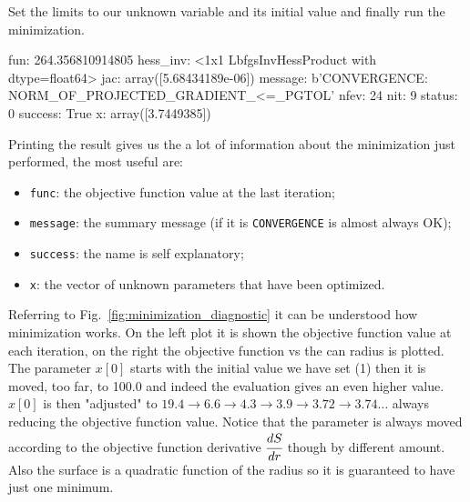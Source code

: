 
Set the limits to our unknown variable and its initial value and finally run the minimization.

\begin{ioutput}
      fun: 264.356810914805
 hess_inv: <1x1 LbfgsInvHessProduct with dtype=float64>
      jac: array([5.68434189e-06])
  message: b'CONVERGENCE: NORM_OF_PROJECTED_GRADIENT_<=_PGTOL'
     nfev: 24
      nit: 9
   status: 0
  success: True
        x: array([3.7449385])
\end{ioutput}

Printing the result gives us the a lot of information about the minimization just performed, the most useful are:
\begin{itemize}
\item \texttt{func}: the objective function value at the last iteration;
\item \texttt{message}: the summary message (if it is \texttt{CONVERGENCE} is almost always OK);
\item \texttt{success}: the name is self explanatory;
\item \texttt{x}: the vector of unknown parameters that have been optimized.
\end{itemize}

Referring to Fig.~\ref{fig:minimization_diagnostic} it can be understood how minimization works. On the left plot it is shown the objective function value at each iteration, on the right the objective function vs the can radius is plotted.
The parameter $x[0]$ starts with the initial value we have set (1) then it is moved, too far, to 100.0 and indeed the evaluation gives an even higher value. $x[0]$ is then "adjusted" to $19.4\rightarrow 6.6\rightarrow 4.3\rightarrow 3.9\rightarrow 3.72\rightarrow 3.74\ldots$ always reducing the objective function value. Notice that the parameter is always moved according to the objective function derivative $\cfrac{dS}{dr}$ though by different amount.
Also the surface is a quadratic function of the radius so it is guaranteed to have just one minimum.

